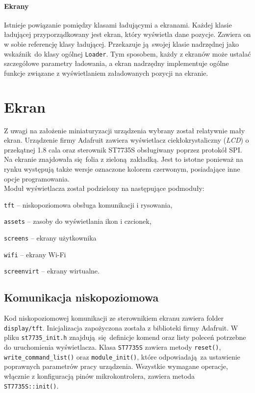 \documentclass[polish]{aghengthesis}
\let\tempone\itemize
\let\temptwo\enditemize
\renewenvironment{itemize}{\tempone\setlength{\itemsep}{0cm}}{\temptwo}
\begin{document}
			\paragraph{Ekrany}
				Istnieje powiązanie pomiędzy klasami ładującymi a ekranami. Każdej klasie ładującej przyporządkowany jest ekran, który wyświetla dane pozycje. Zawiera on w sobie referencję klasy ładującej. Przekazuje ją swojej klasie nadrzędnej jako wskaźnik do klasy ogólnej \lstinline|Loader|. Tym sposobem, każdy z ekranów może ustalać szczegółowe parametry ładowania, a ekran nadrzędny implementuje ogólne funkcje związane z wyświetlaniem załadowanych pozycji na ekranie.
	
	\section{Ekran}
		\label{sec:screen}
		Z uwagi na założenie miniaturyzacji urządzenia wybrany został relatywnie mały ekran. Urządzenie firmy Adafruit zawiera wyświetlacz ciekłokrystaliczny (\textit{LCD}) o przekątnej 1.8 cala oraz sterownik ST7735S obsługiwany poprzez protokół SPI. Na ekranie znajdowała się folia z zieloną zakładką. Jest to istotne ponieważ na rynku występują także wersje oznaczone kolorem czerwonym, posiadające inne opcje programowania.
		$ $\\
		
		\noindent
		Moduł wyświetlacza został podzielony na następujące podmoduły:
		\begin{itemize}
			\item \lstinline|tft| -- niskopoziomowa obsługa komunikacji i rysowania,
			\item \lstinline|assets| -- zasoby do wyświetlania ikon i czcionek,
			\item \lstinline|screens| -- ekrany użytkownika
			\begin{itemize}
				\item \lstinline|wifi| -- ekrany Wi-Fi
			\end{itemize}
			\item \lstinline|screenvirt| -- ekrany wirtualne.
		\end{itemize}
		
		\subsection{Komunikacja niskopoziomowa}
			Kod niskopoziomowej komunikacji ze sterownikiem ekranu zawiera folder \lstinline|display/tft|. Inicjalizacja zapożyczona została z biblioteki firmy Adafruit. W pliku \lstinline|st7735_init.h| znajdują się definicje komend oraz listy poleceń potrzebne do uruchomienia wyświetlacza. Klasa \lstinline|ST7735S| zawiera metody \lstinline|reset()|, \lstinline|write_command_list()| oraz \lstinline|module_init()|, które odpowiadają za ustawienie poprawnych parametrów pracy urządzenia. Wszystkie wymagane operacje, włącznie z konfiguracją pinów mikrokontrolera, zawiera metoda \lstinline|ST7735S::init()|.
			
\end{document}
